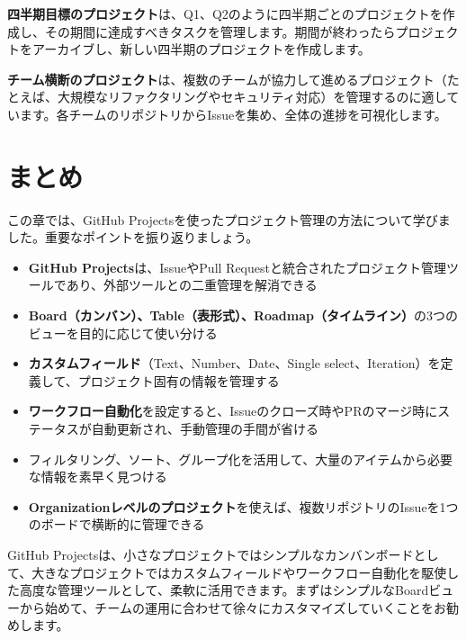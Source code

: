 \textbf{四半期目標のプロジェクト}は、Q1、Q2のように四半期ごとのプロジェクトを作成し、その期間に達成すべきタスクを管理します。期間が終わったらプロジェクトをアーカイブし、新しい四半期のプロジェクトを作成します。

\textbf{チーム横断のプロジェクト}は、複数のチームが協力して進めるプロジェクト（たとえば、大規模なリファクタリングやセキュリティ対応）を管理するのに適しています。各チームのリポジトリからIssueを集め、全体の進捗を可視化します。

\section{まとめ}

この章では、GitHub Projectsを使ったプロジェクト管理の方法について学びました。重要なポイントを振り返りましょう。

\begin{itemize}
  \item \textbf{GitHub Projects}は、IssueやPull Requestと統合されたプロジェクト管理ツールであり、外部ツールとの二重管理を解消できる
  \item \textbf{Board（カンバン）、Table（表形式）、Roadmap（タイムライン）}の3つのビューを目的に応じて使い分ける
  \item \textbf{カスタムフィールド}（Text、Number、Date、Single select、Iteration）を定義して、プロジェクト固有の情報を管理する
  \item \textbf{ワークフロー自動化}を設定すると、Issueのクローズ時やPRのマージ時にステータスが自動更新され、手動管理の手間が省ける
  \item フィルタリング、ソート、グループ化を活用して、大量のアイテムから必要な情報を素早く見つける
  \item \textbf{Organizationレベルのプロジェクト}を使えば、複数リポジトリのIssueを1つのボードで横断的に管理できる
\end{itemize}

GitHub Projectsは、小さなプロジェクトではシンプルなカンバンボードとして、大きなプロジェクトではカスタムフィールドやワークフロー自動化を駆使した高度な管理ツールとして、柔軟に活用できます。まずはシンプルなBoardビューから始めて、チームの運用に合わせて徐々にカスタマイズしていくことをお勧めします。
